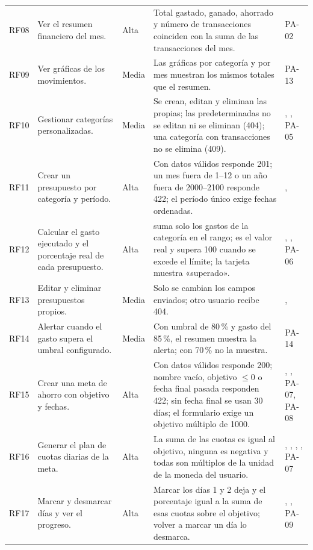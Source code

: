 {\begin{longtable}{L{1cm} L{4.2cm} L{1.1cm} L{5cm} L{2.6cm}}
RF08 & Ver el resumen financiero del mes. & Alta & Total gastado, ganado, ahorrado y número de transacciones coinciden con la suma de las transacciones del mes. & PA-02 \\
RF09 & Ver gráficas de los movimientos. & Media & Las gráficas por categoría y por mes muestran los mismos totales que el resumen. & PA-13 \\
RF10 & Gestionar categorías personalizadas. & Media & Se crean, editan y eliminan las propias; las predeterminadas no se editan ni se eliminan (404); una categoría con transacciones no se elimina (409). & , , PA-05 \\
RF11 & Crear un presupuesto por categoría y período. & Alta & Con datos válidos responde 201; un mes fuera de 1–12 o un año fuera de 2000–2100 responde 422; el período único exige fechas ordenadas. & ,  \\
RF12 & Calcular el gasto ejecutado y el porcentaje real de cada presupuesto. & Alta &  suma solo los gastos de la categoría en el rango;  es el valor real y supera 100 cuando se excede el límite; la tarjeta muestra «superado». & , , PA-06 \\
RF13 & Editar y eliminar presupuestos propios. & Media & Solo se cambian los campos enviados; otro usuario recibe 404. & ,  \\
RF14 & Alertar cuando el gasto supera el umbral configurado. & Media & Con umbral de 80\,\% y gasto del 85\,\%, el resumen muestra la alerta; con 70\,\% no la muestra. & PA-14 \\
RF15 & Crear una meta de ahorro con objetivo y fechas. & Alta & Con datos válidos responde 200; nombre vacío, objetivo $\leq 0$ o fecha final pasada responden 422; sin fecha final se usan 30 días; el formulario exige un objetivo múltiplo de 1000. & , , PA-07, PA-08 \\
RF16 & Generar el plan de cuotas diarias de la meta. & Alta & La suma de las cuotas es igual al objetivo, ninguna es negativa y todas son múltiplos de la unidad de la moneda del usuario. & , , , , PA-07 \\
RF17 & Marcar y desmarcar días y ver el progreso. & Alta & Marcar los días 1 y 2 deja  y el porcentaje igual a la suma de esas cuotas sobre el objetivo; volver a marcar un día lo desmarca. & , , PA-09 \\

\end{longtable}}
